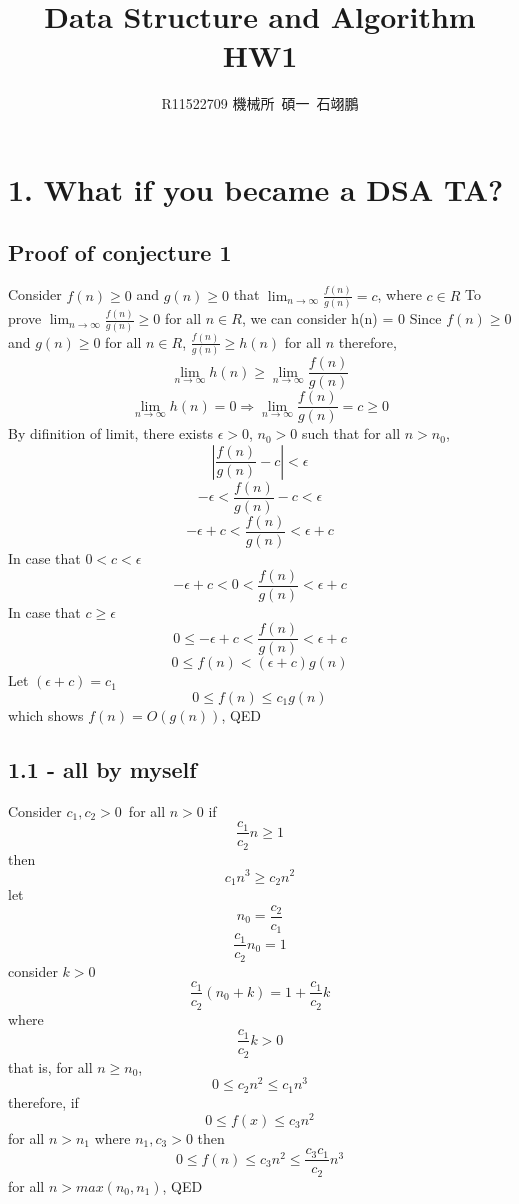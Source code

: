\documentclass[12pt]{article}
\title{Data Structure and Algorithm HW1}
\author{R11522709 機械所\, 碩一\, 石翊鵬}
\begin{document}
\maketitle
\section*{1. What if you became a DSA TA?}
\subsection*{Proof of conjecture 1}
Consider $f(n)\geq 0$ and $g(n) \geq 0$ that $\lim_{n \to \infty} {\frac{f(n)}{g(n)}} = c$, where $c \in R$\newline
To prove $\lim_{n \to \infty} {\frac{f(n)}{g(n)}} \geq 0$ for all $n \in R$, we can consider h(n) = 0\newline
Since \(f(n) \geq 0\) and \(g(n) \geq 0 \) for all \(n\in R\), \(\frac{f(n)}{g(n)} \geq h(n)\) for all \(n\)\newline
therefore,
\[\lim_{n \to \infty}{h(n)}\geq \lim_{n \to \infty} {\frac{f(n)}{g(n)}}\]
\[\lim_{n \to \infty}{h(n)} = 0 \Rightarrow \lim_{n \to \infty} {\frac{f(n)}{g(n)}}=c \geq 0\]
By difinition of limit, there exists $\epsilon > 0$, $n_0 > 0$ such that for all $n > n_0$, \newline
\[|\frac{f(n)}{g(n)}-c|<\epsilon\]
\[-\epsilon < \frac{f(n)}{g(n)} -c < \epsilon\]
\[-\epsilon + c < \frac{f(n)}{g(n)} < \epsilon + c \]
In case that $0 < c < \epsilon$
\[-\epsilon + c < 0 < \frac{f(n)}{g(n)} < \epsilon + c \]
In case that $c \geq \epsilon$
\[0 \leq -\epsilon + c < \frac{f(n)}{g(n)} < \epsilon + c \]
\[0 \leq f(n) < (\epsilon + c)g(n)\]
Let $(\epsilon + c) = c_1$
\[0 \leq f(n) \leq c_1g(n)\]
which shows $f(n) = O(g(n))$, QED
\subsection*{1.1 - all by myself}
Consider $c_1, c_2 >0$\
for all $n > 0$\newline
if
\[\frac{c_1}{c_2}n \geq 1\]
then
\[c_1n^3\geq c_2n^2\]
let
\[n_0 = \frac{c_2}{c_1}\]
\[\frac{c_1}{c_2}n_0 = 1\]
consider $k > 0$
\[\frac{c_1}{c_2}(n_0+k) = 1+\frac{c_1}{c_2}k\]
where
\[\frac{c_1}{c_2}k > 0\]
that is, for all $n \geq n_0$,
\[0\leq c_2n^2 \leq c_1n^3\]
therefore, if
\[0 \leq f(x) \leq c_3n^2\]
for all $n > n_1$ where $n_1, c_3 > 0$\newline
then
\[0 \leq f(n) \leq c_3n^2 \leq \frac{c_3c_1}{c_2}n^3\]
for all $n > max(n_0, n_1)$, QED
\end{document}
